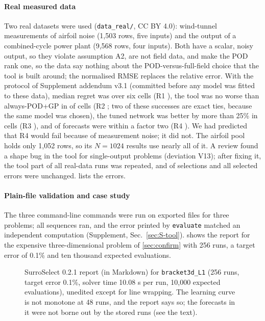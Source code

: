 \paragraph{Real measured data} Two real datasets were used (\texttt{data\_real/}, CC BY 4.0): wind-tunnel measurements of airfoil noise (1,503 rows, five inputs) and the output of a combined-cycle power plant (9,568 rows, four inputs). Both have a scalar, noisy output, so they violate assumption A2, are not field data, and make the POD rank one, so the data say nothing about the POD-versus-full-field choice that the tool is built around; the normalised RMSE replaces the relative error. With the protocol of Supplement addendum v3.1 (committed before any model was fitted to these data), median regret was \RealRoneMedian{} over six cells (R1 \RealRoneVerdict), the tool was no worse than always-POD+GP in \RealRtwoK{} of \RealRtwoN{} cells (R2 \RealRtwoVerdict; two of these successes are exact ties, because the same model was chosen), the tuned network was better by more than 25\% in \RealRthreeK{} cells (R3 \RealRthreeVerdict), and \RealRfourK{} of \RealRfourN{} forecasts were within a factor two (R4 \RealRfourVerdict). We had predicted that R4 would fail because of measurement noise; it did not. The airfoil pool holds only 1,052 rows, so its $N=1024$ results use nearly all of it. A review found a shape bug in the tool for single-output problems (deviation V13); after fixing it, the tool part of all \RecheckN{} real-data runs was repeated, and \RecheckSame{} of \RecheckN{} selections and all selected errors were unchanged.  lists the errors.
\begin{table}[t]\centering\caption{Real-data check: normalised RMSE of the tool, the oracle, always-POD+GP and the tuned network (geometric mean over three seeds).}\label{tab:real}\small\resizebox{\textwidth}{!}{}\end{table}
\paragraph{Plain-file validation and case study} The three command-line commands were run on exported files for three problems; all sequences ran, and the error printed by \texttt{evaluate} matched an independent computation (Supplement, Sec.~\ref{sec:S-tool}).  shows the report for the expensive three-dimensional problem of \cref{sec:confirm} with 256 runs, a target error of 0.1\% and ten thousand expected evaluations.
\begin{figure}[t]\centering\small
\begin{minipage}{0.95\textwidth}\scriptsize\end{minipage}
\caption{SurroSelect 0.2.1 report (in Markdown) for \texttt{bracket3d\_L1} (256 runs, target error 0.1\%, solver time 10.08 s per run, 10,000 expected evaluations), unedited except for line wrapping. The learning curve is not monotone at 48 runs, and the report says so; the forecasts in it were not borne out by the stored runs (see the text).}\label{lst:case}\end{figure}
